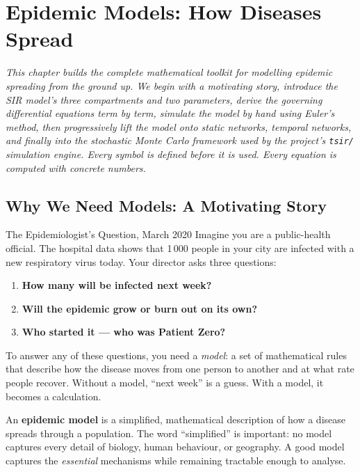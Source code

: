 \chapter{Epidemic Models: How Diseases Spread}

\textit{This chapter builds the complete mathematical toolkit for modelling epidemic spreading from the ground up. We begin with a motivating story, introduce the SIR model's three compartments and two parameters, derive the governing differential equations term by term, simulate the model by hand using Euler's method, then progressively lift the model onto static networks, temporal networks, and finally into the stochastic Monte Carlo framework used by the project's \texttt{tsir/} simulation engine. Every symbol is defined before it is used. Every equation is computed with concrete numbers.}

\section{Why We Need Models: A Motivating Story}
\label{sec:epi_motivation}

\begin{analogybox}{The Epidemiologist's Question, March 2020}
Imagine you are a public-health official. The hospital data shows that 1\,000 people in your city are infected with a new respiratory virus today. Your director asks three questions:

\begin{enumerate}[noitemsep]
    \item \textbf{How many will be infected next week?}
    \item \textbf{Will the epidemic grow or burn out on its own?}
    \item \textbf{Who started it --- who was Patient Zero?}
\end{enumerate}

To answer any of these questions, you need a \emph{model}: a set of mathematical rules that describe how the disease moves from one person to another and at what rate people recover. Without a model, ``next week'' is a guess. With a model, it becomes a calculation.
\end{analogybox}

An \textbf{epidemic model} is a simplified, mathematical description of how a disease spreads through a population. The word ``simplified'' is important: no model captures every detail of biology, human behaviour, or geography. A good model captures the \emph{essential} mechanisms while remaining tractable enough to analyse.


